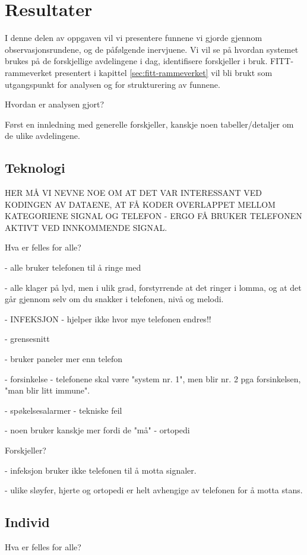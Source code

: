 \chapter{Resultater}
\label{chp:resultater} 

I denne delen av oppgaven vil vi presentere funnene vi gjorde gjennom observasjonsrundene, og de påfølgende inervjuene. Vi vil se på hvordan systemet brukes på de forskjellige avdelingene i dag, identifisere forskjeller i bruk. FITT-rammeverket presentert i kapittel \ref{sec:fitt-rammeverket} vil bli brukt som utgangspunkt for analysen og for strukturering av funnene.

\noindent
Hvordan er analysen gjort?

\noindent
Først en innledning med generelle forskjeller, kanskje noen tabeller/detaljer om de ulike avdelingene.

\section{Teknologi}

HER MÅ VI NEVNE NOE OM AT DET VAR INTERESSANT VED KODINGEN AV DATAENE, AT FÅ KODER OVERLAPPET MELLOM KATEGORIENE SIGNAL OG TELEFON - ERGO FÅ BRUKER TELEFONEN AKTIVT VED INNKOMMENDE SIGNAL. 

Hva er felles for alle?

- alle bruker telefonen til å ringe med

- alle klager på lyd, men i ulik grad, forstyrrende at det ringer i lomma, og at det går gjennom selv om du snakker i telefonen, nivå og melodi.

	- INFEKSJON - hjelper ikke hvor mye telefonen endres!!

- grensesnitt

- bruker paneler mer enn telefon 

- forsinkelse - telefonene skal være "system nr. 1", men blir nr. 2 pga forsinkelsen, "man blir litt immune".

- spøkelsesalarmer - tekniske feil

- noen bruker kanskje mer fordi de "må" - ortopedi

Forskjeller?

- infeksjon bruker ikke telefonen til å motta signaler.

- ulike sløyfer, hjerte og ortopedi er helt avhengige av telefonen for å motta stans.

\section{Individ}
Hva er felles for alle?


